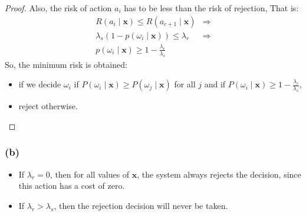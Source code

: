 \documentclass{article}
\begin{document}
\begin{proof}
    Also, the risk of action $a_i$ has to be less than the risk of rejection, That is:
    \begin{equation*}
    \begin{aligned}
        R(a_i \mid \boldsymbol x) \leq R(a_{c + 1} \mid \boldsymbol x) &\Rightarrow \\
        \lambda_s(1 - p(\omega_i \mid \boldsymbol x)) \leq \lambda_r &\Rightarrow \\
        p(\omega_i \mid \boldsymbol x) \geq 1 - \frac{\lambda_r}{\lambda_s}
    \end{aligned}
    \end{equation*}
    So, the minimum risk is obtained:
    \begin{itemize}
        \item if we decide $\omega_i$ if $P(\omega_i \mid \boldsymbol x) \geq P(\omega_j \mid \boldsymbol x)$ for all $j$ and
              if $P(\omega_i \mid \boldsymbol x) \geq 1 - \frac{\lambda_r}{\lambda_s}$,
        \item reject otherwise.
    \end{itemize}
\end{proof}

\subsubsection*{(b)}
\begin{itemize}
    \item If $\lambda_r = 0$, then for all values of $\boldsymbol x$, the system always rejects the decision,
            since this action has a cost of zero.
    \item If $\lambda_r > \lambda_s$, then the rejection decision will never be taken.
\end{itemize}
\end{document}
